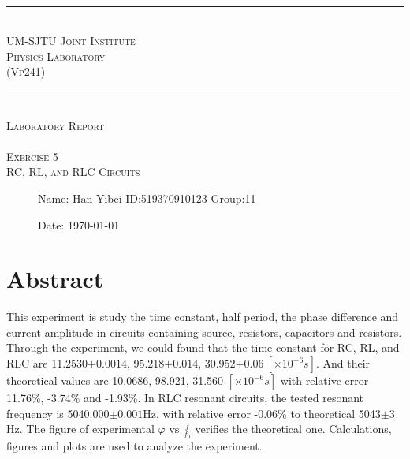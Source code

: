 \documentclass[12pt,a4paper]{article}
\begin{document}
\begin{center}
~\\
\rule[0mm]{400pt}{0.5pt}
\Large{ \textsc{\newline\\UM-SJTU Joint Institute\\Physics Laboratory\\(Vp241)\\}}
\rule[0mm]{400pt}{0.5pt}
\Large{ \textsc{\newline\newline\newline\newline\newline\newline\\
Laboratory Report\\}}
\Large{\textsc{ \\ Exercise 5  \\ RC, RL, and RLC Circuits} }

\end{center}

\begin{description}
    \item[] 
    \item[] 
    \item[] 
    \item[] 
    \item[] 
    \item[]
    \item[]\qquad \qquad Name: Han Yibei \qquad ID:519370910123   \qquad    Group:11\\
    \item[]\qquad \qquad Date: \today
\end{description}

\newpage

\section{Abstract}
This experiment is study the time constant, half period, the phase difference and current amplitude in circuits containing source, resistors, capacitors and resistors. Through the experiment, we could found that the time constant for RC, RL, and RLC are 11.2530$\pm0.0014$, 95.218$\pm0.014$, 30.952$\pm0.06~[\times 10^{-6}s]$. And their theoretical values are 10.0686, 98.921, 31.560 $[\times10^{-6}s]$ with relative error 11.76\%, -3.74\% and -1.93\%. In RLC resonant circuits, the tested resonant frequency is 5040.000$\pm0.001$Hz, with relative error -0.06\% to theoretical 5043$\pm3$Hz. The figure of experimental $\varphi \text{ vs }\frac{f}{f_0}$ verifies the theoretical one. Calculations, figures and plots are used to analyze the experiment.
\end{document}
